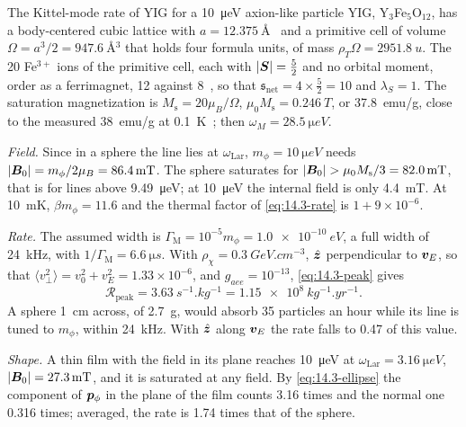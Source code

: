 \begin{workedexample}{The Kittel-mode rate of YIG for a \SI{10}{\micro eV} axion-like particle}\label{we:14-yig}
YIG, Y$_3$Fe$_5$O$_{12}$, has a body-centered cubic lattice with $a = \SI{12.375}{\angstrom}$~\cite{nakatsuka1995site} and a primitive cell of volume $\Omega = a^3/2 = \SI{947.6}{\angstrom^3}$ that holds four formula units, of mass $\rho_T\Omega = \SI{2951.8}{u}$. The 20 Fe$^{3+}$ ions of the primitive cell, each with $|\bm{S}| = \frac52$ and no orbital moment, order as a ferrimagnet, 12 against 8~\cite[Sect.~III]{mitridate2020detectability}, so that $\mathfrak{s}_{\mathrm{net}} = 4\times\frac52 = 10$ and $\lambda_S = 1$. The saturation magnetization is $M_{\mathrm{s}} = 20\mu_B/\Omega$, $\mu_0M_{\mathrm{s}} = \SI{0.246}{T}$, or \SI{37.8}{emu/g}, close to the measured \SI{38}{emu/g} at \SI{0.1}{K}~\cite{chigusa2020detecting}; then $\omega_M = \SI{28.5}{\micro eV}$.

\emph{Field.} Since in a sphere the line lies at $\omega_{\mathrm{Lar}}$, $m_\phi = \SI{10}{\micro eV}$ needs $|\bm{B}_0| = m_\phi/2\mu_B = \SI{86.4}{mT}$. The sphere saturates for $|\bm{B}_0| > \mu_0M_{\mathrm{s}}/3 = \SI{82.0}{mT}$, that is for lines above \SI{9.49}{\micro eV}; at \SI{10}{\micro eV} the internal field is only \SI{4.4}{mT}. At \SI{10}{mK}, $\beta m_\phi = 11.6$ and the thermal factor of \cref{eq:14.3-rate} is $1 + 9\times10^{-6}$.

\emph{Rate.} The assumed width is $\varGamma_{\mathrm{M}} = 10^{-5}m_\phi = \SI{1.0e-10}{eV}$, a full width of \SI{24}{kHz}, with $1/\varGamma_{\mathrm{M}} = \SI{6.6}{\micro s}$. With $\rho_\chi = \SI{0.3}{GeV.cm^{-3}}$, $\hat{\bm{z}}$ perpendicular to $\bm{v}_E$, so that $\langle v_\perp^2\rangle = v_0^2 + v_E^2 = 1.33\times10^{-6}$, and $g_{aee} = 10^{-13}$, \cref{eq:14.3-peak} gives
\begin{equation*}
  \mathcal{R}_{\mathrm{peak}} = \SI{3.63}{s^{-1}.kg^{-1}} = \SI{1.15e8}{kg^{-1}.yr^{-1}} .
\end{equation*}
A sphere \SI{1}{cm} across, of \SI{2.7}{g}, would absorb 35 particles an hour while its line is tuned to $m_\phi$, within \SI{24}{kHz}. With $\hat{\bm{z}}$ along $\bm{v}_E$ the rate falls to 0.47 of this value.

\emph{Shape.} A thin film with the field in its plane reaches \SI{10}{\micro eV} at $\omega_{\mathrm{Lar}} = \SI{3.16}{\micro eV}$, $|\bm{B}_0| = \SI{27.3}{mT}$, and it is saturated at any field. By \cref{eq:14.3-ellipse} the component of $\bm{p}_\phi$ in the plane of the film counts 3.16 times and the normal one 0.316 times; averaged, the rate is 1.74 times that of the sphere.
\end{workedexample}

